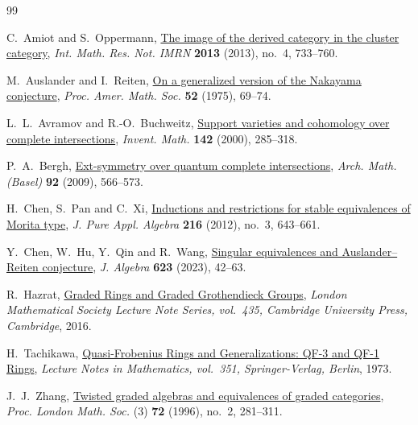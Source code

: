 \documentclass[11pt,a4paper]{article}
\numberwithin{equation}{section}
\theoremstyle{definition}
\theoremstyle{plain}
\theoremstyle{remark}
\begin{document}
\begin{thebibliography}{99}
\raggedright

{\sc C.~Amiot} and {\sc S.~Oppermann},
\href{https://doi.org/10.1093/imrn/rns010}{The image of the derived category in the cluster category},
\emph{Int. Math. Res. Not. IMRN} \textbf{2013} (2013), no.~4, 733--760.

{\sc M.~Auslander} and {\sc I.~Reiten},
\href{https://doi.org/10.1090/S0002-9939-1975-0389977-6}{On a generalized version of the Nakayama conjecture},
\emph{Proc. Amer. Math. Soc.} \textbf{52} (1975), 69--74.

{\sc L.~L.~Avramov} and {\sc R.-O.~Buchweitz},
\href{https://doi.org/10.1007/s002220000090}{Support varieties and cohomology over complete intersections},
\emph{Invent. Math.} \textbf{142} (2000), 285--318.

{\sc P.~A.~Bergh},
\href{https://doi.org/10.1007/s00013-009-3128-z}{Ext-symmetry over quantum complete intersections},
\emph{Arch. Math. (Basel)} \textbf{92} (2009), 566--573.

{\sc H.~Chen}, {\sc S.~Pan} and {\sc C.~Xi},
\href{https://doi.org/10.1016/j.jpaa.2011.07.016}{Inductions and restrictions for stable equivalences of Morita type},
\emph{J. Pure Appl. Algebra} \textbf{216} (2012), no.~3, 643--661.

{\sc Y.~Chen}, {\sc W.~Hu}, {\sc Y.~Qin} and {\sc R.~Wang},
\href{https://doi.org/10.1016/j.jalgebra.2023.02.018}{Singular equivalences and Auslander--Reiten conjecture},
\emph{J. Algebra} \textbf{623} (2023), 42--63.


{\sc R.~Hazrat},
\href{https://doi.org/10.1017/CBO9781316717134}{Graded Rings and Graded Grothendieck Groups},
\emph{London Mathematical Society Lecture Note Series, vol.~435,
Cambridge University Press, Cambridge}, 2016.

{\sc H.~Tachikawa},
\href{https://doi.org/10.1007/BFb0059997}{Quasi-Frobenius Rings and Generalizations: QF-3 and QF-1 Rings},
\emph{Lecture Notes in Mathematics, vol.~351, Springer-Verlag, Berlin}, 1973.

{\sc J.~J.~Zhang},
\href{https://doi.org/10.1112/plms/s3-72.2.281}{Twisted graded algebras and equivalences of graded categories},
\emph{Proc. London Math. Soc.} (3) \textbf{72} (1996), no.~2, 281--311.

\end{thebibliography}
\end{document}

